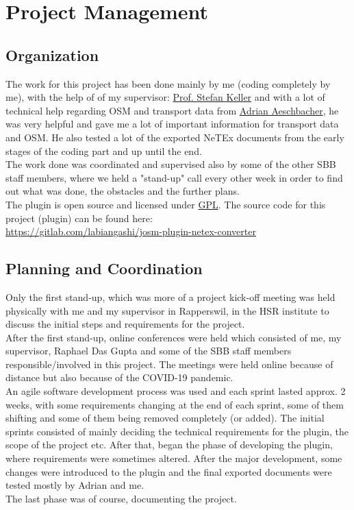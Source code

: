 \chapter{Project Management}
\section{Organization}
The work for this project has been done mainly by me (coding completely by me), with the help of of my supervisor: \href{mailto:stefan.keller@hsr.ch}{Prof. Stefan Keller} and with a lot of technical help regarding OSM and transport data from \href{mailto:adrian.aeschbacher2@sbb.ch}{Adrian Aeschbacher}, he was very helpful and gave me a lot of important information for transport data and OSM. He also tested a lot of the exported NeTEx documents from the early stages of the coding part and up until the end.\\
\newline
The work done was coordinated and supervised also by some of the other SBB staff members, where we held a "stand-up" call every other week in order to find out what was done, the obstacles and the further plans.\\
The plugin is open source and licensed under \href{https://www.gnu.org/licenses/gpl-3.0.en.html}{GPL}.
\newline
The source code for this project (plugin) can be found here:\\ \href{https://gitlab.com/labiangashi/josm-plugin-netex-converter}{https://gitlab.com/labiangashi/josm-plugin-netex-converter}
\newpage
\section{Planning and Coordination}
Only the first stand-up, which was more of a project kick-off meeting was held physically with me and my supervisor in Rapperswil, in the HSR institute to discuss the initial steps and requirements for the project.\\
After the first stand-up, online conferences were held which consisted of me, my supervisor, Raphael Das Gupta and some of the SBB staff members responsible/involved in this project. The meetings were held online because of distance but also because of the COVID-19 pandemic.\\
An agile software development process was used and each sprint lasted approx. 2 weeks, with some requirements changing at the end of each sprint, some of them shifting and some of them being removed completely (or added). The initial sprints consisted of mainly deciding the technical requirements for the plugin, the scope of the project etc. After that, began the phase of developing the plugin, where requirements were sometimes altered. After the major development, some changes were introduced to the plugin and the final exported documents were tested mostly by Adrian and me.\\
The last phase was of course, documenting the project.
\newpage

